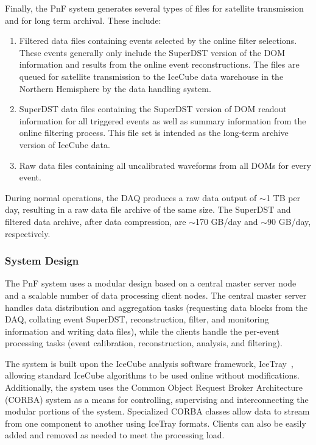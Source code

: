 Finally, the PnF system generates several types of files for satellite
transmission and for long term archival. These
include:   
\begin{enumerate}
\item Filtered data files containing events selected by the online filter
  selections.  These events generally only include the SuperDST version of
  the DOM information and results from the online event reconstructions.
  The files are queued for satellite transmission to the IceCube data
  warehouse in the Northern Hemisphere by the data handling system.
\item SuperDST data files containing the SuperDST version of DOM readout
  information for all triggered events as well as summary information from
  the online filtering process.  This file set is intended as the long-term
  archive version of IceCube data.
\item Raw data files containing all uncalibrated waveforms from all DOMs for
  every event.  %
\end{enumerate}

During normal operations, the DAQ produces a raw data output of
$\sim$1 TB per day, resulting in a raw data file 
archive of the same size.  The SuperDST and filtered data archive, after
data compression, are $\sim$170 GB/day and $\sim$90 GB/day, respectively.

\subsubsection{System Design}

The PnF system uses a modular design based on
a central master server node and a scalable number of data processing client
nodes.  The central master server handles data distribution and
aggregation tasks (requesting data blocks from the DAQ, collating event
SuperDST, reconstruction, filter, and monitoring information and writing
data files), while the clients handle the per-event processing
tasks (event calibration, reconstruction, analysis, and filtering).

The system is built upon the IceCube analysis software framework,
IceTray~\cite{DeYoung:2005zz}, allowing standard IceCube algorithms to be
used online without modifications.
Additionally, the system uses the Common Object Request Broker Architecture
(CORBA) system as a means for controlling, supervising and interconnecting
the modular portions of the system.  Specialized CORBA classes allow
data to stream from one component to another using IceTray formats.
Clients can also be easily added and removed as needed to meet the
processing load.

